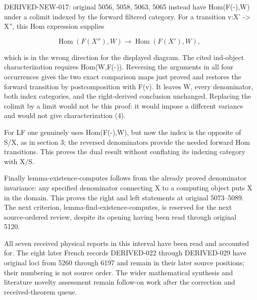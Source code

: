 DERIVED-NEW-017:\allowbreak{} original 5056,\allowbreak{} 5058,\allowbreak{} 5063,\allowbreak{} 5065 instead have Hom(F(-)\allowbreak{},\allowbreak{}W)\allowbreak{} under a colimit indexed by the forward filtered category. For a transition v:\allowbreak{}X' \allowbreak{}-> X'',\allowbreak{} this Hom expression supplies

\[
 \operatorname{Hom}(F(X''),W)\longrightarrow
 \operatorname{Hom}(F(X'),W),
\]

which is in the wrong direction for the displayed diagram. The cited ind-object characterization requires Hom(W,\allowbreak{}F(-)\allowbreak{})\allowbreak{}. Reversing the arguments in all four occurrences gives the two exact comparison maps just proved and restores the forward transition by postcomposition with F(v)\allowbreak{}. It leaves W,\allowbreak{} every denominator,\allowbreak{} both index categories,\allowbreak{} and the right-derived conclusion unchanged. Replacing the colimit by a limit would not be this proof:\allowbreak{} it would impose a different variance and would not give characterization (4)\allowbreak{}.

For LF one genuinely uses Hom(F(-)\allowbreak{},\allowbreak{}W)\allowbreak{},\allowbreak{} but now the index is the opposite of S/\allowbreak{}X,\allowbreak{} as in section 3; the reversed denominators provide the needed forward Hom transitions. This proves the dual result without conflating its indexing category with X/\allowbreak{}S.

Finally lemma-existence-computes follows from the already proved denominator invariance:\allowbreak{} any specified denominator connecting X to a computing object puts X in the domain. This proves the right and left statements at original 5073–\allowbreak{}5089. The next criterion,\allowbreak{} lemma-find-existence-computes,\allowbreak{} is reserved for the next source-ordered review,\allowbreak{} despite its opening having been read through original 5120.

All seven received physical reports in this interval have been read and accounted for. The eight later French records DERIVED-022 through DERIVED-029 have original loci from 5260 through 6197 and remain in their later source positions; their numbering is not source order. The wider mathematical synthesis and literature novelty assessment remain follow-on work after the correction and received-theorem queue.
